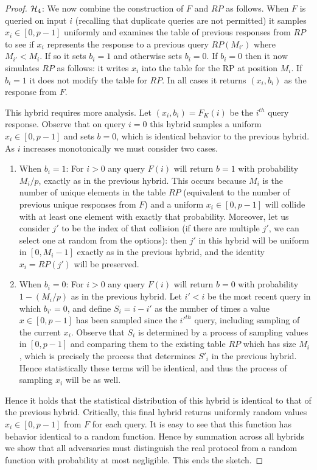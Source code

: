 \begin{proof}
	$\mathcal{H}_4$: We now combine the construction of $F$ and $RP$ as follows.
	When $F$ is queried on input $i$ (recalling that duplicate queries are not permitted) it samples $x_i \in [0,p-1]$ uniformly and examines the table of previous responses from $RP$ to see if $x_i$ represents the response to a previous query $RP(M_{i'})$ where $M_{i'} < M_i$.
	If so it sets $b_i=1$ and otherwise sets $b_i=0$.
	If $b_i=0$ then it now simulates $RP$ as follows: it writes $x_i$ into the table for the RP at position $M_i$.
	If $b_i=1$ it does not modify the table for $RP$.
	In all cases it returns $(x_i,b_i)$ as the response from $F$.

	This hybrid requires more analysis.
	Let $(x_i, b_i) = F_K(i)$ be the $i^{th}$ query response.
	Observe that on query $i=0$ this hybrid samples a uniform $x_i \in [0,p-1]$ and sets $b=0$, which is identical behavior to the previous hybrid.
	As $i$ increases monotonically we must consider two cases.

	\begin{enumerate}
		\item When $b_i=1$: For $i>0$ any query $F(i)$ will return $b=1$ with probability $M_i/p$, exactly as in the previous hybrid.
		      This occurs because $M_i$ is the number of unique elements in the table $RP$ (equivalent to the number of previous unique responses from $F$) and a uniform $x_i \in [0,p-1]$ will collide with at least one element with exactly that probability.
		      Moreover, let us consider $j'$ to be the index of that collision (if there are multiple $j'$, we can select one at random from the options): then $j'$ in this hybrid will be uniform in $[0,M_i-1]$ exactly as in the previous hybrid, and the identity $x_i = RP(j')$ will be preserved.

		\item When $b_i=0$: For $i>0$ any query $F(i)$ will return $b=0$ with probability $1-(M_i/p)$ as in the previous hybrid.
		      Let $i' < i$ be the most recent query in which $b_{i'} = 0$, and define $S_i = i-i'$ as the number of times a value $x \in [0,p-1]$ has been sampled since the $i'^{th}$ query, including sampling of the current $x_i$.
		      Observe that $S_i$ is determined by a process of sampling values in $[0,p-1]$ and comparing them to the existing table $RP$ which has size $M_{i}$, which is precisely the process that determines $S'_i$ in the previous hybrid.
		      Hence statistically these terms will be identical, and thus the process of sampling $x_i$ will be as well.
	\end{enumerate}

	Hence it holds that the statistical distribution of this hybrid is identical to that of the previous hybrid.
	Critically, this final hybrid returns uniformly random values $x_i \in [0,p-1]$ from $F$ for each query.
	It is easy to see that this function has behavior identical to a random function.
	Hence by summation across all hybrids we show that all adversaries must distinguish the real protocol from a random function with probability at most negligible.
	This ends the sketch.
\end{proof}

